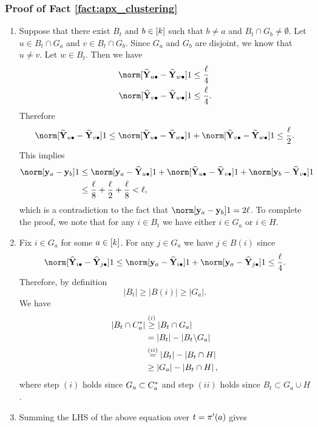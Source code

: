 \subsubsection{Proof of Fact \ref{fact:apx_clustering}\label{sec:proof_fact_apx_clustering}}
\begin{enumerate}
\item Suppose that there exist $B_{t}$ and $b\in\left[k\right]$
such that $b\ne a$ and $B_{t}\cap G_{b}\ne\emptyset$. Let $u\in B_{t}\cap G_{a}$
and $v\in B_{t}\cap G_{b}$. Since $G_{a}$ and $G_{b}$ are disjoint,
we know that $u\ne v$. Let $w\in B_{t}$. Then we have 
\begin{align*}
\norm[\Yhat_{u\bullet}-\Yhat_{w\bullet}]1 & \leq\frac{\size}{4}\\
\norm[\Yhat_{v\bullet}-\Yhat_{w\bullet}]1 & \leq\frac{\size}{4}.
\end{align*}
Therefore 
\[
\norm[\Yhat_{u\bullet}-\Yhat_{v\bullet}]1\leq\norm[\Yhat_{u\bullet}-\Yhat_{w\bullet}]1+\norm[\Yhat_{v\bullet}-\Yhat_{w\bullet}]1\le\frac{\size}{2}.
\]
This implies 
\begin{align*}
\norm[\y_{a}-\y_{b}]1 & \leq\norm[\y_{a}-\Yhat_{u\bullet}]1+\norm[\Yhat_{u\bullet}-\Yhat_{v\bullet}]1+\norm[\y_{b}-\Yhat_{v\bullet}]1\\
 & \leq\frac{\size}{8}+\frac{\size}{2}+\frac{\size}{8}<\size,
\end{align*}
which is a contradiction to the fact that $\norm[\y_{a}-\y_{b}]1=2\size$.
To complete the proof, we note that for any $i\in B_{t}$ we have
either $i\in G_{a}$ or $i\in H$.
\item Fix $i\in G_{a}$ for some $a\in\left[k\right]$. For any
$j\in G_{a}$ we have $j\in B(i)$ since 
\[
\norm[\Yhat_{i\bullet}-\Yhat_{j\bullet}]1\le\norm[\y_{a}-\Yhat_{i\bullet}]1+\norm[\y_{a}-\Yhat_{j\bullet}]1\le\frac{\size}{4}.
\]
Therefore, by definition 
\[
\left|B_{t}\right|\ge\left|B(i)\right|\ge\left|G_{a}\right|.
\]
We have 
\begin{align*}
\left|B_{t}\cap C_{a}^{*}\right| & \overset{(i)}{\ge}\left|B_{t}\cap G_{a}\right|\\
 & =\left|B_{t}\right|-\left|B_{t}\backslash G_{a}\right|\\
 & \overset{(ii)}{=}\left|B_{t}\right|-\left|B_{t}\cap H\right|\\
 & \ge\left|G_{a}\right|-\left|B_{t}\cap H\right|,
\end{align*}
where step $(i)$ holds since $G_{a}\subset C_{a}^{*}$ and step
$(ii)$ holds since $B_{t}\subset G_{a}\cup H$.
\item Summing the LHS of the above equation over $t=\pi'(a)$ gives 

\end{enumerate}
